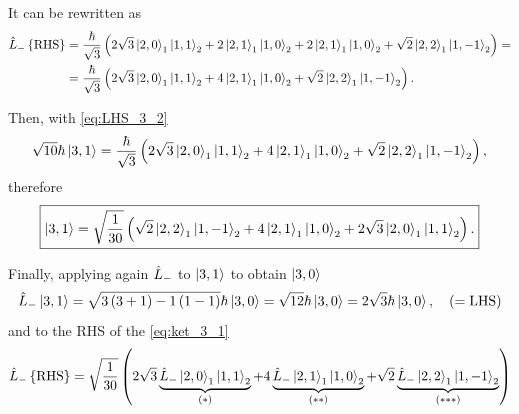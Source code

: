 It can be rewritten as
\begin{align}
    \notag
    \hat{L}_{-} \left\{ \text{RHS} \right\} &=
    \frac{ \hbar }{\sqrt{3}} \left( 2\sqrt{3} \Ket{2,0}_1 \Ket{1,1}_2 + 2 \Ket{2,1}_1 \Ket{1,0}_2 +
    2 \Ket{2,1}_1 \Ket{1,0}_2 + \sqrt{2} \Ket{2,2}_1 \Ket{1,-1}_2 \right) = \\
                                    &=
                                    \frac{ \hbar }{\sqrt{3}} \left( 2\sqrt{3} \Ket{2,0}_1 \Ket{1,1}_2 + 4 \Ket{2,1}_1 \Ket{1,0}_2 +
                                    \sqrt{2} \Ket{2,2}_1 \Ket{1,-1}_2 \right).
\end{align}

Then, with \cref{eq:LHS_3_2} 
\begin{equation}
    \sqrt{10} \hbar \Ket{3,1} = 
    \frac{ \hbar }{\sqrt{3}} \left( 2\sqrt{3} \Ket{2,0}_1 \Ket{1,1}_2 + 4 \Ket{2,1}_1 \Ket{1,0}_2 +
                                    \sqrt{2} \Ket{2,2}_1 \Ket{1,-1}_2 \right),
\end{equation}
therefore
\begin{equation}\label{eq:ket_3_1}
    \boxed{
        \Ket{3,1} = 
        \sqrt{\frac{1}{30}} \left( \sqrt{2} \Ket{2,2}_1 \Ket{1,-1}_2 + 4 \Ket{2,1}_1 \Ket{1,0}_2 + 2\sqrt{3} \Ket{2,0}_1 \Ket{1,1}_2 \right).
    }
\end{equation}

Finally, applying again $\hat{L}_{-}$ to $\Ket{3,1}$ to obtain $\Ket{3,0}$ 
\begin{equation}\label{eq:LHS_3_1}
    \hat{L}_{-} \Ket{3,1} = \sqrt{3\left( 3 + 1 \right) - 1\left( 1 - 1 \right)} \hbar \Ket{3,0} = \sqrt{12} \hbar \Ket{3,0} = 2 \sqrt{3} \hbar \Ket{3,0}, \quad \left( =\text{LHS} \right)
\end{equation}
and to the RHS of the \cref{eq:ket_3_1}
\begin{equation}\label{eq:RHS_3_1}
    \hat{L}_{-} \left\{ \text{RHS} \right\} =
    \sqrt{\frac{1}{30}} \left( 2 \sqrt{3} 
    \underbrace{\hat{L}_{-} \Ket{2,0}_1 \Ket{1,1}_2}_{(*)}
    + 4 
    \underbrace{\hat{L}_{-} \Ket{2,1}_1 \Ket{1,0}_2 }_{(**)}
    + \sqrt{2} 
    \underbrace{\hat{L}_{-} \Ket{2,2}_1 \Ket{1,-1}_2 }_{(***)}
    \right)
\end{equation}

